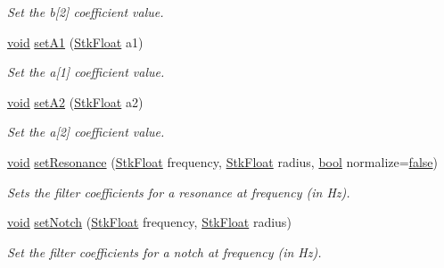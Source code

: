\begin{DoxyCompactItemize}
\begin{DoxyCompactList}\small\item\em Set the b\mbox{[}2\mbox{]} coefficient value. \end{DoxyCompactList}\item 
\hyperlink{sound_8c_ae35f5844602719cf66324f4de2a658b3}{void} \hyperlink{class_nyq_1_1_bi_quad_a37881e8273f38fa01ff274229bc3feaa}{set\+A1} (\hyperlink{namespace_nyq_a044fa20a706520a617bbbf458a7db7e4}{Stk\+Float} a1)
\begin{DoxyCompactList}\small\item\em Set the a\mbox{[}1\mbox{]} coefficient value. \end{DoxyCompactList}\item 
\hyperlink{sound_8c_ae35f5844602719cf66324f4de2a658b3}{void} \hyperlink{class_nyq_1_1_bi_quad_acf8aa743a757fb06125bc6e9b6bc1eb6}{set\+A2} (\hyperlink{namespace_nyq_a044fa20a706520a617bbbf458a7db7e4}{Stk\+Float} a2)
\begin{DoxyCompactList}\small\item\em Set the a\mbox{[}2\mbox{]} coefficient value. \end{DoxyCompactList}\item 
\hyperlink{sound_8c_ae35f5844602719cf66324f4de2a658b3}{void} \hyperlink{class_nyq_1_1_bi_quad_afbed42c8fec1fb34db9a4675840c965a}{set\+Resonance} (\hyperlink{namespace_nyq_a044fa20a706520a617bbbf458a7db7e4}{Stk\+Float} frequency, \hyperlink{namespace_nyq_a044fa20a706520a617bbbf458a7db7e4}{Stk\+Float} radius, \hyperlink{mac_2config_2i386_2lib-src_2libsoxr_2soxr-config_8h_abb452686968e48b67397da5f97445f5b}{bool} normalize=\hyperlink{mac_2config_2i386_2lib-src_2libsoxr_2soxr-config_8h_a65e9886d74aaee76545e83dd09011727}{false})
\begin{DoxyCompactList}\small\item\em Sets the filter coefficients for a resonance at {\itshape frequency} (in Hz). \end{DoxyCompactList}\item 
\hyperlink{sound_8c_ae35f5844602719cf66324f4de2a658b3}{void} \hyperlink{class_nyq_1_1_bi_quad_a00330fa273cb1e0dfa5f2fe4bba8ae6b}{set\+Notch} (\hyperlink{namespace_nyq_a044fa20a706520a617bbbf458a7db7e4}{Stk\+Float} frequency, \hyperlink{namespace_nyq_a044fa20a706520a617bbbf458a7db7e4}{Stk\+Float} radius)
\begin{DoxyCompactList}\small\item\em Set the filter coefficients for a notch at {\itshape frequency} (in Hz). \end{DoxyCompactList}\item 

\end{DoxyCompactItemize}
